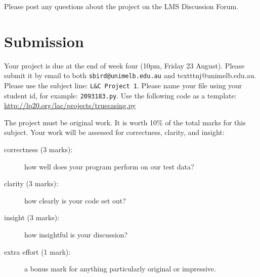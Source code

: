 \documentclass[a4paper,10pt]{article}
\begin{document}
Please post any questions about the project on the LMS Discussion Forum.

\section*{Submission}

Your project is due at the end of week four (10pm, Friday 23 August). Please submit it by email to
both \texttt{sbird@unimelb.edu.au} and texttt{nj@unimelb.edu.au}. Please use the subject line: \texttt{L&C Project 1}.
Please name your file using your student id, for example: \texttt{2093183.py}. Use the following code as a
template: \url{http://lp20.org/lac/projects/truecasing.py}

The project must be original work.
It is worth 10\% of the total marks for this subject.
Your work will be assessed for correctness, clarity, and insight:

\begin{description}
\item[correctness (3 marks):] how well does your program perform on our test data?
\item[clarity (3 marks):] how clearly is your code set out?
\item[insight (3 marks):] how insightful is your discussion?
\item[extra effort (1 mark):] a bonus mark for anything particularly original or impressive.
\end{description}
\end{document}
